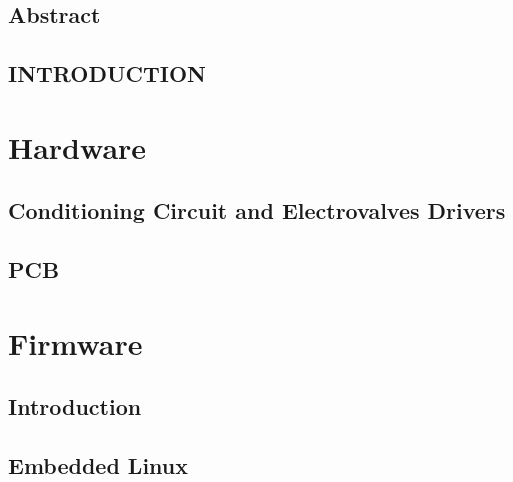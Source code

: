 \documentclass[a4paper,12pt,openany,twoside, abstracton]{book}%
\begin{document}
 \selectfont


\newpage
{}


\linespread{1.5}
\chapter*{Abstract}



\cleardoublepage
\tableofcontents
\cleardoublepage
{}

\chapter*{INTRODUCTION}\label{summary}

\cleardoublepage
\part{Hardware}

\newpage

\chapter{Conditioning Circuit and Electrovalves Drivers}\label{ch:Analog}


\chapter{PCB}


\part{Firmware}
\chapter{Introduction}\label{ch:IIintroduction}


\chapter{Embedded Linux}\label{ch:firmware}

\end{document}
